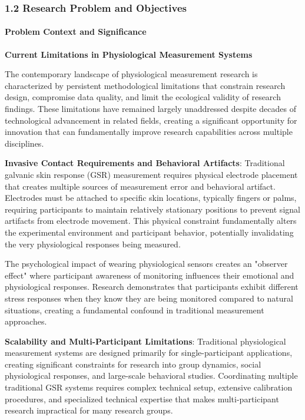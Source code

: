 \documentclass[12pt,a4paper]{report}
\begin{document}
\subsubsection{1.2 Research Problem and Objectives}

\paragraph{Problem Context and Significance}

\textbf{Current Limitations in Physiological Measurement Systems}

The contemporary landscape of physiological measurement research is characterized by persistent methodological
limitations that constrain research design, compromise data quality, and limit the ecological validity of research
findings. These limitations have remained largely unaddressed despite decades of technological advancement in related
fields, creating a significant opportunity for innovation that can fundamentally improve research capabilities across
multiple disciplines.

\textbf{Invasive Contact Requirements and Behavioral Artifacts}: Traditional galvanic skin response (GSR) measurement
requires physical electrode placement that creates multiple sources of measurement error and behavioral artifact.
Electrodes must be attached to specific skin locations, typically fingers or palms, requiring participants to maintain
relatively stationary positions to prevent signal artifacts from electrode movement. This physical constraint
fundamentally alters the experimental environment and participant behavior, potentially invalidating the very
physiological responses being measured.

The psychological impact of wearing physiological sensors creates an "observer effect" where participant awareness of
monitoring influences their emotional and physiological responses. Research demonstrates that participants exhibit
different stress responses when they know they are being monitored compared to natural situations, creating a
fundamental confound in traditional measurement approaches.

\textbf{Scalability and Multi-Participant Limitations}: Traditional physiological measurement systems are designed primarily
for single-participant applications, creating significant constraints for research into group dynamics, social
physiological responses, and large-scale behavioral studies. Coordinating multiple traditional GSR systems requires
complex technical setup, extensive calibration procedures, and specialized technical expertise that makes
multi-participant research impractical for many research groups.
\end{document}
